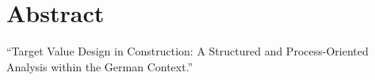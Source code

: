 \cleardoublepage
{}
{} %
\chapter*{Abstract}

“Target Value Design in Construction: A Structured and Process-Oriented Analysis within the German Context.”